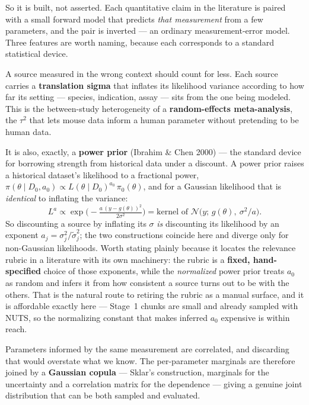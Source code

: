 \documentclass[11pt]{article}
\newcommand{\vocab}[1]{\textcolor{vocabc}{\textbf{#1}}}
\renewcommand{\th}{\theta}
\begin{document}
So it is built, not asserted. Each quantitative claim in the literature is paired with a
small forward model that predicts \emph{that measurement} from a few parameters, and the
pair is inverted --- an ordinary measurement-error model. Three features are worth naming,
because each corresponds to a standard statistical device.

A source measured in the wrong context should count for less. Each source carries a
\vocab{translation sigma} that inflates its likelihood variance according to how far its
setting --- species, indication, assay --- sits from the one being modeled. This is the
between-study heterogeneity of a \vocab{random-effects meta-analysis}, the $\tau^2$ that
lets mouse data inform a human parameter without pretending to be human data.

It is also, exactly, a \vocab{power prior} (Ibrahim \& Chen 2000) --- the standard device
for borrowing strength from historical data under a discount. A power prior raises a
historical dataset's likelihood to a fractional power,
$\pi(\th \mid D_0, a_0) \propto L(\th \mid D_0)^{a_0}\,\pi_0(\th)$, and for a Gaussian
likelihood that is \emph{identical} to inflating the variance:
\[
  L^{a} \propto \exp\!\Big(-\tfrac{a\,(y - g(\th))^2}{2\sigma^2}\Big)
       = \text{kernel of } \mathcal{N}\big(y;\, g(\th),\ \sigma^2/a\big).
\]
So discounting a source by inflating its $\sigma$ \emph{is} discounting its likelihood by
an exponent $a_j = \sigma_j^2 / \tilde\sigma_j^2$; the two constructions coincide here
and diverge only for non-Gaussian likelihoods. Worth stating plainly because it locates
the relevance rubric in a literature with its own machinery: the rubric is a
\textbf{fixed, hand-specified} choice of those exponents, while the \emph{normalized}
power prior treats $a_0$ as random and infers it from how consistent a source turns out
to be with the others. That is the natural route to retiring the rubric as a manual
surface, and it is affordable exactly here --- Stage~1 chunks are small and already
sampled with NUTS, so the normalizing constant that makes inferred $a_0$ expensive is
within reach.

Parameters informed by the same measurement are correlated, and discarding that would
overstate what we know. The per-parameter marginals are therefore joined by a
\vocab{Gaussian copula} --- Sklar's construction, marginals for the uncertainty and a
correlation matrix for the dependence --- giving a genuine joint distribution that can be
both sampled and evaluated.
\end{document}
